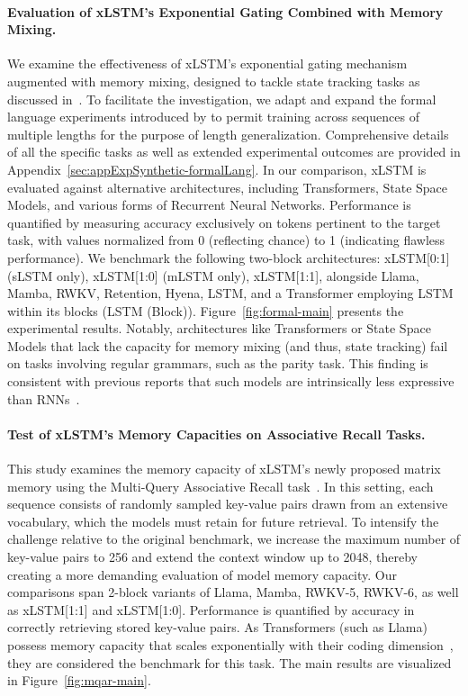 \paragraph{Evaluation of xLSTM's Exponential Gating Combined with Memory Mixing.} We examine the effectiveness of xLSTM's exponential gating mechanism augmented with memory mixing, designed to tackle state tracking tasks as discussed in~\citet{Merrill:24, Merrill:23}. To facilitate the investigation, we adapt and expand the formal language experiments introduced by \citet{Deletang:23} to permit training across sequences of multiple lengths for the purpose of length generalization. Comprehensive details of all the specific tasks as well as extended experimental outcomes are provided in Appendix~\ref{sec:appExpSynthetic-formalLang}. In our comparison, xLSTM is evaluated against alternative architectures, including Transformers, State Space Models, and various forms of Recurrent Neural Networks. Performance is quantified by measuring accuracy exclusively on tokens pertinent to the target task, with values normalized from 0 (reflecting chance) to 1 (indicating flawless performance). We benchmark the following two-block architectures: xLSTM[0:1] (sLSTM only), xLSTM[1:0] (mLSTM only), xLSTM[1:1], alongside Llama, Mamba, RWKV, Retention, Hyena, LSTM, and a Transformer employing LSTM within its blocks (LSTM (Block)). Figure~\ref{fig:formal-main} presents the experimental results. Notably, architectures like Transformers or State Space Models that lack the capacity for memory mixing (and thus, state tracking) fail on tasks involving regular grammars, such as the parity task. This finding is consistent with previous reports that such models are intrinsically less expressive than RNNs~\citep{Merrill:24, Merrill:23, Deletang:23}.

\paragraph{Test of xLSTM's Memory Capacities on Associative Recall Tasks.} This study examines the memory capacity of xLSTM's newly proposed matrix memory using the Multi-Query Associative Recall task~\citep{Arora:23arxiv}. In this setting, each sequence consists of randomly sampled key-value pairs drawn from an extensive vocabulary, which the models must retain for future retrieval. To intensify the challenge relative to the original benchmark, we increase the maximum number of key-value pairs to 256 and extend the context window up to 2048, thereby creating a more demanding evaluation of model memory capacity. Our comparisons span 2-block variants of Llama, Mamba, RWKV-5, RWKV-6, as well as xLSTM[1:1] and xLSTM[1:0]. Performance is quantified by accuracy in correctly retrieving stored key-value pairs. As Transformers (such as Llama) possess memory capacity that scales exponentially with their coding dimension~\citep{Ramsauer:21}, they are considered the benchmark for this task. The main results are visualized in Figure~\ref{fig:mqar-main}.

